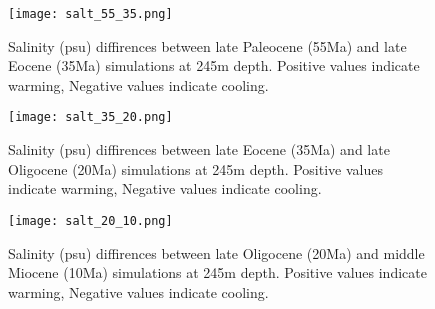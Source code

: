 \begin{figure}[H]
	\texttt{[image: salt\_55\_35.png]}
	\caption{Salinity (psu) diffirences between late Paleocene (55Ma) and late Eocene (35Ma) simulations at 245m depth. Positive values indicate warming, Negative values indicate cooling.}
	\label{fig:salt5535cooling}
\end{figure}
\begin{figure}[H]
	\texttt{[image: salt\_35\_20.png]}
	\caption{Salinity (psu) diffirences between late Eocene (35Ma) and late Oligocene (20Ma) simulations at 245m depth. Positive values indicate warming, Negative values indicate cooling.}
	\label{fig:salt3520cooling}
\end{figure}
\begin{figure}[H]
	\texttt{[image: salt\_20\_10.png]}
	\caption{Salinity (psu) diffirences between late Oligocene (20Ma) and middle Miocene (10Ma) simulations at 245m depth. Positive values indicate warming, Negative values indicate cooling.}
	\label{fig:salt2010cooling}
\end{figure}

